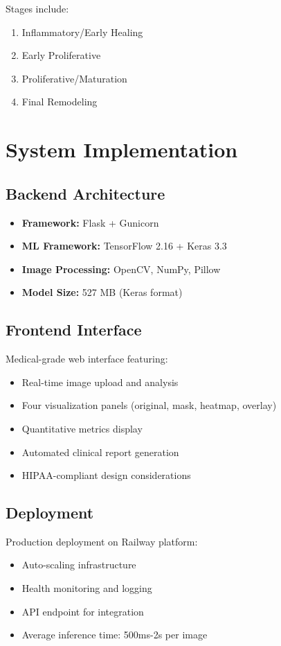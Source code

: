 \documentclass[conference]{IEEEtran}
\begin{document}
Stages include:
\begin{enumerate}
    \item Inflammatory/Early Healing
    \item Early Proliferative
    \item Proliferative/Maturation
    \item Final Remodeling
\end{enumerate}

\section{System Implementation}

\subsection{Backend Architecture}
\begin{itemize}
    \item \textbf{Framework:} Flask + Gunicorn
    \item \textbf{ML Framework:} TensorFlow 2.16 + Keras 3.3
    \item \textbf{Image Processing:} OpenCV, NumPy, Pillow
    \item \textbf{Model Size:} 527 MB (Keras format)
\end{itemize}

\subsection{Frontend Interface}
Medical-grade web interface featuring:
\begin{itemize}
    \item Real-time image upload and analysis
    \item Four visualization panels (original, mask, heatmap, overlay)
    \item Quantitative metrics display
    \item Automated clinical report generation
    \item HIPAA-compliant design considerations
\end{itemize}

\subsection{Deployment}
Production deployment on Railway platform:
\begin{itemize}
    \item Auto-scaling infrastructure
    \item Health monitoring and logging
    \item API endpoint for integration
    \item Average inference time: 500ms-2s per image
\end{itemize}
\end{document}
